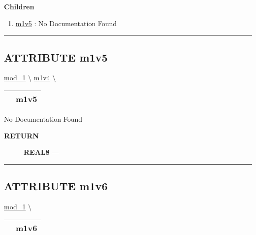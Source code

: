 \textbf{Children}
\begin{enumerate}
\item \hyperlink{ecldoc:mod_1.m1v4.m1v5}{m1v5}
: No Documentation Found
\end{enumerate}

\rule{\linewidth}{0.5pt}

\subsection*{\textsf{\colorbox{headtoc}{\color{white} ATTRIBUTE}
m1v5}}

\hypertarget{ecldoc:mod_1.m1v4.m1v5}{}
\hspace{0pt} \hyperlink{ecldoc:mod_1}{mod_1} \textbackslash 
\hspace{0pt} \hyperlink{ecldoc:mod_1.m1v4}{m1v4} \textbackslash 

{\renewcommand{\arraystretch}{1.5}
\begin{tabularx}{\textwidth}{|>{\raggedright\arraybackslash}l|X|}
\hline
\hspace{0pt}\mytexttt{\color{red} } & \textbf{m1v5} \\
\hline
\end{tabularx}
}

\par





No Documentation Found








\par
\begin{description}
\item [\colorbox{tagtype}{\color{white} \textbf{\textsf{RETURN}}}] \textbf{REAL8} --- 
\end{description}




\rule{\linewidth}{0.5pt}


\subsection*{\textsf{\colorbox{headtoc}{\color{white} ATTRIBUTE}
m1v6}}

\hypertarget{ecldoc:mod_1.m1v6}{}
\hspace{0pt} \hyperlink{ecldoc:mod_1}{mod_1} \textbackslash 

{\renewcommand{\arraystretch}{1.5}
\begin{tabularx}{\textwidth}{|>{\raggedright\arraybackslash}l|X|}
\hline
\hspace{0pt}\mytexttt{\color{red} } & \textbf{m1v6} \\
\hline
\end{tabularx}
}

